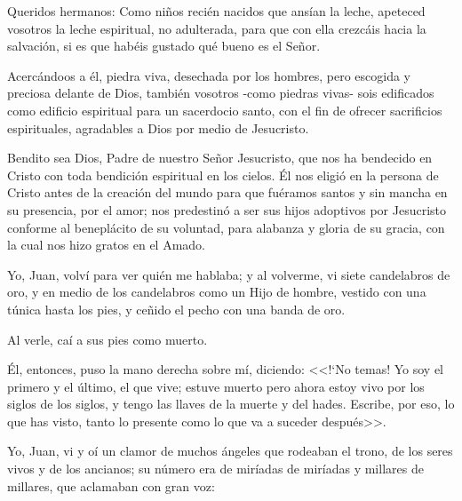 


 Queridos hermanos: Como niños recién 
nacidos que ansían la leche, apeteced vosotros 
la leche espiritual, no adulterada, para que con 
ella crezcáis hacia la salvación, si es que habéis 
gustado qué bueno es el Señor. 

 Acercándoos a 
él, piedra viva, desechada por los hombres, 
pero escogida y preciosa delante de Dios, 
también vosotros -como piedras vivas- sois 
edificados como edificio espiritual para un 
sacerdocio santo, con el fin de ofrecer 
sacrificios espirituales, agradables a Dios por 
medio de Jesucristo. 





 Bendito sea Dios, Padre de nuestro Señor 
Jesucristo, que nos ha bendecido en Cristo con 
toda bendición espiritual en los cielos. Él nos 
eligió en la persona de Cristo antes de la 
creación del mundo para que fuéramos santos 
y sin mancha en su presencia, por el amor; nos 
predestinó a ser sus hijos adoptivos por 
Jesucristo conforme al beneplácito de su 
voluntad, para alabanza y gloria de su gracia, 
con la cual nos hizo gratos en el Amado. 




 Yo, Juan, volví para ver quién me hablaba; y al 
volverme, vi siete candelabros de oro, y en 
medio de los candelabros como un Hijo de 
hombre, vestido con una túnica hasta los pies, 
y ceñido el pecho con una banda de oro.  

Al 
verle, caí a sus pies como muerto. 

 Él, entonces, 
puso la mano derecha sobre mí, diciendo: <<!`No 
temas! Yo soy el primero y el último, el que 
vive; estuve muerto pero ahora estoy vivo por 
los siglos de los siglos, y tengo las llaves de la 
muerte y del hades. Escribe, por eso, lo que 
has visto, tanto lo presente como lo que va a 
suceder después>>. 


 Yo, Juan, vi y oí un clamor de muchos ángeles 
que rodeaban el trono, de los seres vivos y de 
los ancianos; su número era de miríadas de 
miríadas y millares de millares, que aclamaban 
con gran voz:  

